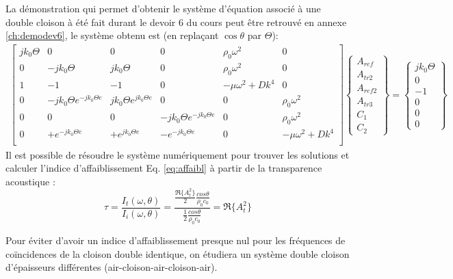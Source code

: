 \documentclass[12pt,foolscap]{report}
\begin{document}
	La démonstration qui permet d'obtenir le système d'équation  associé à une double cloison à été fait durant le devoir 6 du cours peut être retrouvé en annexe \ref{ch:demodev6}, le système obtenu est (en replaçant $\cos \theta$ par $\Theta$):
	\begin{align}	
	\begin{bmatrix}
	j k_0 \Theta    &0 & 0 &0&\rho_0\omega^2&0  \\
	0       & -j k_0 \Theta & j k_0 \Theta & 0 &\rho_0\omega^2 & 0  \\
	1       & -1 & -1 & 0 &-\mu \omega^2+Dk^4 & 0  \\
	0    &-j k_0 \Theta e^{-jk_0\Theta e}   & j k_0 \Theta e^{jk_0\Theta e}   &0&0&\rho_0\omega^2  \\
	0       & 0 & 0 &- j k_0 \Theta e^{-jk_0\Theta e} &0 & \rho_0\omega^2   \\
	0     & + e^{-jk_0\Theta e} & +e^{jk_0\Theta e} & - 	e^{-jk_0\Theta e} &0 & -\mu \omega^2+Dk^4  \\
	\end{bmatrix}
	\begin{Bmatrix}
	A_{ref} \\
	A_{tr2} \\
	A_{ref2}\\
	A_{tr3}\\
	C_{1} \\
	C_{2} 
	\end{Bmatrix}
	=\begin{Bmatrix}
	j k_0 \Theta \\
	0 \\
	-1\\
	0\\
	0 \\
	0
	\end{Bmatrix}
	\end{align}
	Il est possible de résoudre le système numériquement pour trouver les solutions et calculer l'indice d'affaiblissement Eq. \ref{eq:affaibl} à partir de la transparence acoustique : 
	\begin{equation}
	\tau = \frac{I_t(\omega,\theta)}{I_i(\omega,\theta)} = \frac{\frac{ \Re\{A_t^2\}}{2}\frac{cos\theta}{\rho_0 c_0}}{\frac{1}{2}\frac{cos\theta}{\rho_0 c_0}}=\Re \{A_t^2\}
	\end{equation}
	
	Pour éviter d'avoir un indice d'affaiblissement presque nul pour les fréquences de coïncidences de la cloison double identique, on étudiera un système double cloison d'épaisseurs différentes (air-cloison-air-cloison-air).
	
\end{document}

